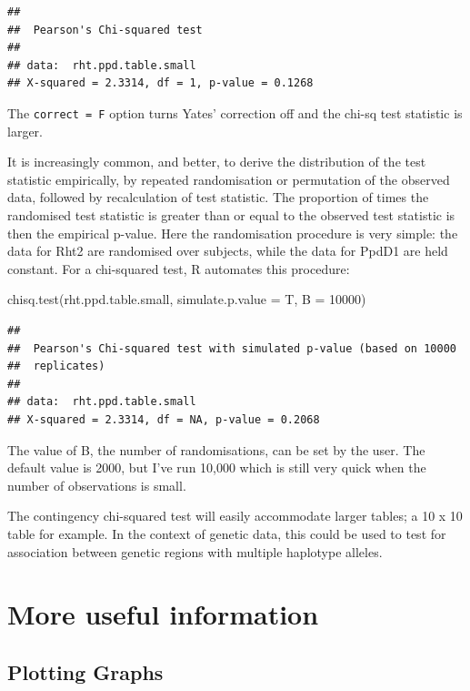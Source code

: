 \documentclass[
]{book}
\newenvironment{Shaded}{\begin{snugshade}}{\end{snugshade}}
\newcommand{\AttributeTok}[1]{\textcolor[rgb]{0.77,0.63,0.00}{#1}}
\newcommand{\DecValTok}[1]{\textcolor[rgb]{0.00,0.00,0.81}{#1}}
\newcommand{\FunctionTok}[1]{\textcolor[rgb]{0.00,0.00,0.00}{#1}}
\newcommand{\NormalTok}[1]{#1}
\begin{document}
\begin{verbatim}
## 
##  Pearson's Chi-squared test
## 
## data:  rht.ppd.table.small
## X-squared = 2.3314, df = 1, p-value = 0.1268
\end{verbatim}

The \texttt{correct\ =\ F} option turns Yates' correction off and the chi-sq test statistic is larger.

It is increasingly common, and better, to derive the distribution of the test statistic empirically, by repeated randomisation or permutation of the observed data, followed by recalculation of test statistic. The proportion of times the randomised test statistic is greater than or equal to the observed test statistic is then the empirical p-value. Here the randomisation procedure is very simple: the data for Rht2 are randomised over subjects, while the data for PpdD1 are held constant. For a chi-squared test, R automates this procedure:

\begin{Shaded}
\begin{Highlighting}[]
\FunctionTok{chisq.test}\NormalTok{(rht.ppd.table.small, }\AttributeTok{simulate.p.value =}\NormalTok{ T, }\AttributeTok{B =} \DecValTok{10000}\NormalTok{)}
\end{Highlighting}
\end{Shaded}

\begin{verbatim}
## 
##  Pearson's Chi-squared test with simulated p-value (based on 10000
##  replicates)
## 
## data:  rht.ppd.table.small
## X-squared = 2.3314, df = NA, p-value = 0.2068
\end{verbatim}

The value of B, the number of randomisations, can be set by the user. The default value is 2000, but I've run 10,000 which is still very quick when the number of observations is small.

The contingency chi-squared test will easily accommodate larger tables; a 10 x 10 table for example. In the context of genetic data, this could be used to test for association between genetic regions with multiple haplotype alleles.

\hypertarget{more-useful-information}{%
\section{More useful information}\label{more-useful-information}}

\hypertarget{plotting-graphs}{%
\subsection{Plotting Graphs}\label{plotting-graphs}}
\end{document}
